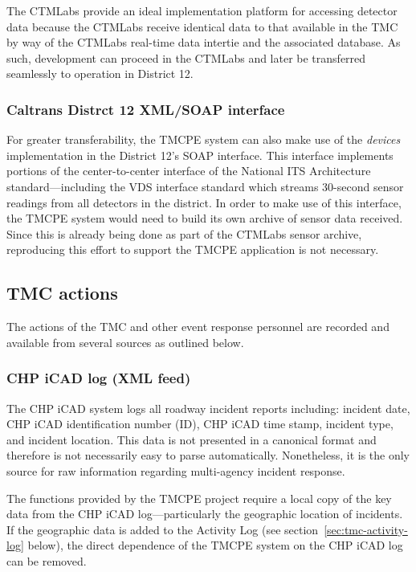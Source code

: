 \documentclass[12pt]{report}
\newcounter{time}
\begin{document}
The \ac{CTMLabs} provide an ideal implementation platform for
accessing detector data because the \ac{CTMLabs} receive identical
data to that available in the \ac{TMC} by way of the \ac{CTMLabs}
real-time data intertie and the associated database.  As such,
development can proceed in the \ac{CTMLabs} and later be transferred
seamlessly to operation in District 12.

\subsubsection{Caltrans Distrct 12 XML/SOAP interface}
\label{sec:d12-soap}

For greater transferability, the \ac{TMCPE} system can also make use
of the \emph{devices} implementation in the District 12's SOAP
interface.  This interface implements portions of the center-to-center
interface of the National ITS Architecture standard---including the
\ac{VDS} interface standard which streams 30-second sensor readings from
all detectors in the district.  In order to make use of this
interface, the \ac{TMCPE} system would need to build its own archive
of sensor data received.  Since this is already being done as part of
the \ac{CTMLabs} sensor archive, reproducing this effort to support
the \ac{TMCPE} application is not necessary.

\subsection{TMC actions}
\label{sec:tmc-actions}

The actions of the \ac{TMC} and other event response personnel are
recorded and available from several sources as outlined below.

\subsubsection{CHP iCAD log (XML feed)}
\label{sec:chp-icad-log}

The \ac{CHP} \ac{iCAD} system logs all roadway incident reports
including: incident date, \ac{CHP} \ac{iCAD} identification number
(ID), \ac{CHP} \ac{iCAD} time stamp, incident type, and incident
location. This data is not presented in a canonical format and
therefore is not necessarily easy to parse automatically.  Nonetheless,
it is the only source for raw information regarding multi-agency
incident response.

The functions provided by the \ac{TMCPE} project require a local copy
of the key data from the \ac{CHP} \ac{iCAD} log---particularly the
geographic location of incidents.  If the geographic data is added to
the Activity Log (see section~\ref{sec:tmc-activity-log} below), the
direct dependence of the \ac{TMCPE} system on the \ac{CHP} \ac{iCAD}
log can be removed.
\end{document}
